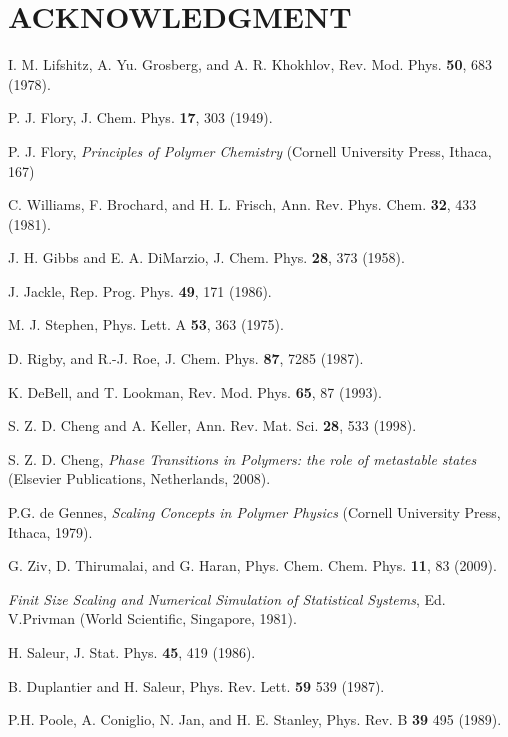 \documentclass[preprint,preprintnumbers,amsmath,amssymb,showpacs,aps,pre]{revtex4-1}
\begin{document}
\section*{ACKNOWLEDGMENT}

\begin{thebibliography}{10}

I. M. Lifshitz, A. Yu. Grosberg, and A. R. Khokhlov, Rev. Mod. Phys.
{\bf 50}, 683 (1978).

P. J. Flory, J. Chem. Phys. {\bf 17}, 303 (1949).

P. J. Flory, {\it Principles of Polymer Chemistry} (Cornell University
Press, Ithaca, 167)

C. Williams, F. Brochard, and H. L. Frisch, Ann. Rev. Phys. Chem.
{\bf 32}, 433 (1981).

J. H. Gibbs and E. A. DiMarzio, J. Chem. Phys. {\bf 28}, 373 (1958).

J. Jackle, Rep. Prog. Phys. {\bf 49}, 171 (1986).

M. J. Stephen, Phys. Lett. A {\bf 53}, 363 (1975).

D. Rigby, and R.-J. Roe, J. Chem. Phys. {\bf 87}, 7285 (1987).

K. DeBell, and T. Lookman, Rev. Mod. Phys. {\bf 65}, 87 (1993).

S. Z. D. Cheng and A. Keller, Ann. Rev. Mat. Sci. {\bf 28}, 533 (1998).

S. Z. D. Cheng, {\it Phase Transitions in Polymers: the role of
metastable states} (Elsevier Publications, Netherlands, 2008).

P.G. de Gennes, {\it Scaling Concepts in Polymer Physics} (Cornell
University Press, Ithaca, 1979).

G. Ziv, D. Thirumalai, and G. Haran, Phys. Chem. Chem. Phys. {\bf 11},
83 (2009).

{\it Finit Size Scaling and Numerical Simulation of Statistical Systems},
Ed. V.Privman (World Scientific, Singapore, 1981).

H. Saleur, J. Stat. Phys. {\bf 45}, 419 (1986).

B. Duplantier and H. Saleur, Phys. Rev. Lett. {\bf 59} 539 (1987).

P.H. Poole, A. Coniglio, N. Jan, and H. E. Stanley, Phys. Rev. B
{\bf 39} 495 (1989).


\end{thebibliography}
\end{document}
